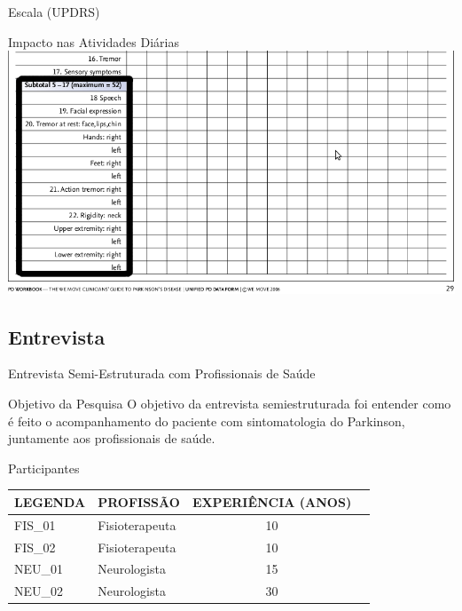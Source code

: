 \documentclass{beamer}
\begin{document}
\begin{frame}{Escala (UPDRS)} 
    \begin{block}{Impacto nas Atividades Diárias}
      \center \includegraphics[height=2.0 in]{img/updr2-sel.png}
    \end{block}
\end{frame}


\subsection{Entrevista}
\begin{frame}{Entrevista Semi-Estruturada com Profissionais de Saúde} 
    \begin{block}{Objetivo da Pesquisa}
    O objetivo da entrevista semiestruturada foi entender como é feito o acompanhamento do paciente com sintomatologia do Parkinson, juntamente aos profissionais de saúde.
    \end{block}
		\begin{block}{Participantes}
			\begin{table}[h]
			\begin{tabular}{|l|l|c|c|}
			\hline
			\textbf{LEGENDA} & \textbf{PROFISSÃO}             & \multicolumn{1}{|l|}{\textbf{EXPERIÊNCIA (ANOS)}} \\ \hline
			FIS\_01          & Fisioterapeuta & 10                                                \\ \hline
			FIS\_02          & Fisioterapeuta    & 10                                                \\ \hline
			NEU\_01          & Neurologista            & 15                                                \\ \hline
			NEU\_02          & Neurologista            & 30                                                \\ \hline
			\end{tabular}
			\end{table}
    \end{block}
\end{frame} 
\end{document}
